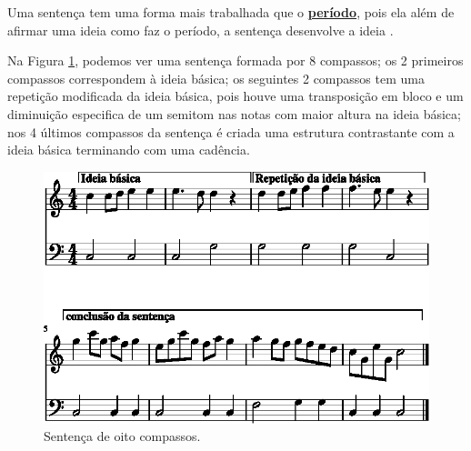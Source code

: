 Uma sentença tem uma forma mais trabalhada que o \hyperref[sec:Periodo]{\textbf{período}}, 
pois ela além de afirmar uma ideia como faz o período, a sentença desenvolve a ideia  
\cite[pp. 59]{schoenberg1990fundamentos} \cite[pp. 58]{schoenberg1967fundamentals}.

\begin{example}
Na Figura \ref{fig:sentence-ex1}, podemos ver uma sentença formada por 8 compassos;
os 2 primeiros compassos correspondem à ideia básica;
os seguintes 2 compassos tem uma repetição modificada da ideia básica, 
pois houve uma transposição em bloco e 
um diminuição especifica de um semitom nas notas com maior altura na ideia básica;
nos 4 últimos compassos da sentença é criada uma estrutura contrastante com a ideia básica terminando com uma cadência.
\end{example}

\begin{figure}[!h]
  \centering
    \includegraphics[width=\textwidth]{chapters/cap-musica-composer/sentence-ex1-1.eps}
\caption{Sentença de oito compassos.}
\label{fig:sentence-ex1}
\end{figure}
